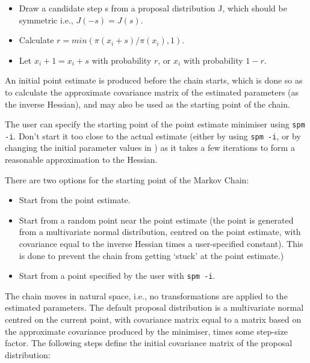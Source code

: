 \begin{itemize}
\item Draw a candidate step s from a proposal distribution J, which should be symmetric i.e., $J(-s)=J(s)$.

\item Calculate $r=min(\pi(x_i+s)/\pi(x_i),1)$. 

\item Let $x_i+1=x_i+s$ with probability $r$, or $x_i$ with probability $1-r$.
\end{itemize}

An initial point estimate is produced before the chain starts, which is done so as to calculate the approximate covariance matrix of the estimated parameters (as the inverse Hessian), and may also be used as the starting point of the chain. 

The user can specify the starting point of the point estimate minimiser using \texttt{spm -i}. Don't start it too close to the actual estimate (either by using \texttt{spm -i}, or by changing the initial parameter values in \config) as it takes a few iterations to form a reasonable approximation to the Hessian. 

There are two options for the starting point of the Markov Chain: 

\begin{itemize}
\item Start from the point estimate.
\item Start from a random point near the point estimate (the point is generated from a multivariate normal distribution, centred on the point estimate, with covariance equal to the inverse Hessian times a user-specified constant). This is done to prevent the chain from getting `stuck' at the point estimate.)
\item Start from a point specified by the user with \texttt{spm -i}.
\end{itemize}

The chain moves in natural space, i.e., no transformations are applied to the estimated parameters. The default proposal distribution is a multivariate normal centred on the current point, with covariance matrix equal to a matrix based on the approximate covariance produced by the minimiser, times some step-size factor. The following steps define the initial covariance matrix of the proposal distribution: 

